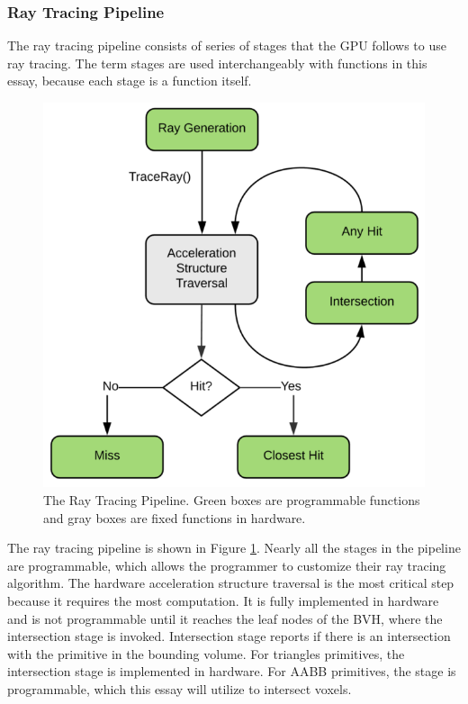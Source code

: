\documentclass[12pt]{article}
\begin{document}
\subsubsection{Ray Tracing Pipeline}

The ray tracing pipeline consists of series of stages that the GPU follows to use ray tracing.
The term stages are used interchangeably with functions in this essay, because each stage is a function itself.

\begin{figure}[H]
    \begin{center}
        \includegraphics[scale=0.5]{RayTracing-Pipeline}
    \end{center}
    \caption{
        The Ray Tracing Pipeline.
        Green boxes are programmable functions and gray boxes are fixed functions in hardware.
        \parencite{NVIDIA:DXR-Intro}
    }
    \label{fig:RayTracing-Pipeline}
\end{figure}

The ray tracing pipeline is shown in Figure \ref{fig:RayTracing-Pipeline}.
Nearly all the stages in the pipeline are programmable, which allows the programmer to customize their ray tracing algorithm.
The hardware acceleration structure traversal is the most critical step because it requires the most computation.
It is fully implemented in hardware and is not programmable until it reaches the leaf nodes of the BVH, where the intersection stage is invoked.
Intersection stage reports if there is an intersection with the primitive in the bounding volume.
For triangles primitives, the intersection stage is implemented in hardware.
For AABB primitives, the stage is programmable, which this essay will utilize to intersect voxels.
\end{document}
